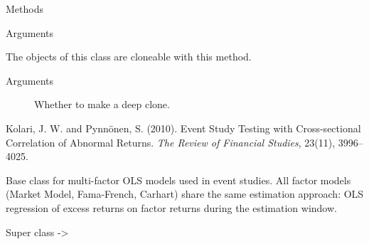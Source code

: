 \documentclass[a4paper]{book}
\begin{document}
\begin{Section}{Methods}
\begin{SubSection}{}
\begin{SubSubSection}{Arguments}
\begin{description}
\end{description}



\end{SubSubSection}

\end{SubSection}




\hypertarget{method-KolariPynnonenTest-clone}{}
%
\begin{SubSection}{}
The objects of this class are cloneable with this method.
%

%
\begin{SubSubSection}{Arguments}

\begin{description}

\item[] Whether to make a deep clone.

\end{description}



\end{SubSubSection}

\end{SubSection}


\end{Section}
%
\begin{References}
Kolari, J. W. and Pynnönen, S. (2010). Event Study Testing with
Cross-sectional Correlation of Abnormal Returns.
\emph{The Review of Financial Studies}, 23(11), 3996--4025.
\end{References}
%
\begin{Description}
Base class for multi-factor OLS models used in event studies. All factor
models (Market Model, Fama-French, Carhart) share the same estimation
approach: OLS regression of excess returns on factor returns during the
estimation window.
\end{Description}
%
\begin{Section}{Super class}
 -> 
\end{Section}
\end{document}
